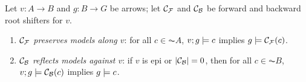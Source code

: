 \begin{proposition}
Let $v:A\to B$ and $g:B\to G$ be arrows; let $\mathcal{C}_{\mathcal{F}}$ and $\mathcal{C}_{\mathcal{B}}$ be forward and backward root shifters for $v$.
\begin{enumerate}
\item \emph{$\mathcal{C}_{\mathcal{F}}$ preserves models along $v$}: for all $c\in\AC A$, $v;g\models c$ implies $g\models \mathcal{C}_{\mathcal{F}}(c)$.
\item \emph{$\mathcal{C}_{\mathcal{B}}$ reflects models against $v$}: if $v$ is epi or $|\mathcal{C}_{\mathcal{B}}|=0$, then for all $c\in\AC B$, $v;g\models \mathcal{C}_{\mathcal{B}}(c)$ implies $g\models c$.
\end{enumerate}
\end{proposition}
%

